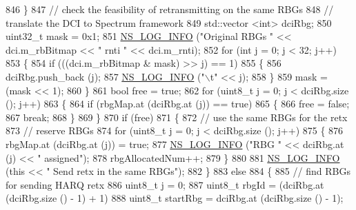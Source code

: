 \begin{DoxyCode}
846             \}
847           \textcolor{comment}{// check the feasibility of retransmitting on the same RBGs}
848           \textcolor{comment}{// translate the DCI to Spectrum framework}
849           std::vector <int> dciRbg;
850           uint32\_t mask = 0x1;
851           \hyperlink{group__logging_gafbd73ee2cf9f26b319f49086d8e860fb}{NS\_LOG\_INFO} (\textcolor{stringliteral}{"Original RBGs "} << dci.m\_rbBitmap << \textcolor{stringliteral}{" rnti "} << dci.m\_rnti);
852           \textcolor{keywordflow}{for} (\textcolor{keywordtype}{int} j = 0; j < 32; j++)
853             \{
854               \textcolor{keywordflow}{if} (((dci.m\_rbBitmap & mask) >> j) == 1)
855                 \{
856                   dciRbg.push\_back (j);
857                   \hyperlink{group__logging_gafbd73ee2cf9f26b319f49086d8e860fb}{NS\_LOG\_INFO} (\textcolor{stringliteral}{"\(\backslash\)t"} << j);
858                 \}
859               mask = (mask << 1);
860             \}
861           \textcolor{keywordtype}{bool} free = \textcolor{keyword}{true};
862           \textcolor{keywordflow}{for} (uint8\_t j = 0; j < dciRbg.size (); j++)
863             \{
864               \textcolor{keywordflow}{if} (rbgMap.at (dciRbg.at (j)) == \textcolor{keyword}{true})
865                 \{
866                   free = \textcolor{keyword}{false};
867                   \textcolor{keywordflow}{break};
868                 \}
869             \}
870           \textcolor{keywordflow}{if} (free)
871             \{
872               \textcolor{comment}{// use the same RBGs for the retx}
873               \textcolor{comment}{// reserve RBGs}
874               \textcolor{keywordflow}{for} (uint8\_t j = 0; j < dciRbg.size (); j++)
875                 \{
876                   rbgMap.at (dciRbg.at (j)) = \textcolor{keyword}{true};
877                   \hyperlink{group__logging_gafbd73ee2cf9f26b319f49086d8e860fb}{NS\_LOG\_INFO} (\textcolor{stringliteral}{"RBG "} << dciRbg.at (j) << \textcolor{stringliteral}{" assigned"});
878                   rbgAllocatedNum++;
879                 \}
880 
881               \hyperlink{group__logging_gafbd73ee2cf9f26b319f49086d8e860fb}{NS\_LOG\_INFO} (\textcolor{keyword}{this} << \textcolor{stringliteral}{" Send retx in the same RBGs"});
882             \}
883           \textcolor{keywordflow}{else}
884             \{
885               \textcolor{comment}{// find RBGs for sending HARQ retx}
886               uint8\_t j = 0;
887               uint8\_t rbgId = (dciRbg.at (dciRbg.size () - 1) + 1) %
888               uint8\_t startRbg = dciRbg.at (dciRbg.size () - 1);

\end{DoxyCode}

